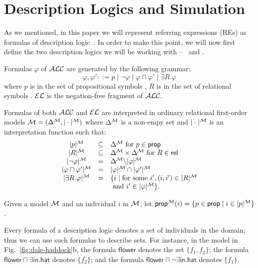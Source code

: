\section{Description Logics and Simulation} \label{sec:bisim}

As we mentioned, in this paper we will represent referring expressions
(REs) as formulas of description logic~\cite{baad:desc03}.  In order
to make this point, we will now first define the two description
logics we will be working with -- \alc\ and \el.


\begin{definition}
Formulas $\varphi$ of $\mathcal{ALC}$ are generated by the following grammar:
$$
\varphi,\varphi' ::= p \mid \neg \varphi \mid \varphi \sqcap \varphi'
\mid \exists R. \varphi
$$
where $p$ is in the set of propositional symbols \prop, $R$ is in the
set of relational symbols \rel. $\mathcal{EL}$ is the negation-free fragment of $\mathcal{ALC}$.

Formulas of both $\mathcal{ALC}$ and $\mathcal{EL}$ are interpreted in ordinary
relational first-order models $\mathcal{M} = (\Delta^{\mathcal{M}},|\cdot|^{\mathcal{M}})$ where
$\Delta^{\mathcal{M}}$ is a non-empy set and $|\cdot|^{\mathcal{M}}$ is an
interpretation function such that:
$$
\begin{array}{ccl}
|p|^{\mathcal{M}} & \subseteq & \Delta^{\mathcal{M}}  \mbox{ for $p \in \textsf{prop}$}\\
|R|^{\mathcal{M}} & \subseteq & \Delta^{\mathcal{M}} \times \Delta^{\mathcal{M}}  \mbox{ for $R \in \textsf{rel}$}\\
|\neg \varphi|^{\mathcal{M}} & = & \Delta^{\mathcal{M}} \backslash |\varphi|^{\mathcal{M}}\\
|\varphi \sqcap \varphi'|^{\mathcal{M}} & = & |\varphi|^{\mathcal{M}} \cap |\varphi'|^{\mathcal{M}}\\
|\exists R.\varphi|^{\mathcal{M}} & = & \{i \mid \mbox{for some } i', (i,i') \in |R|^{\mathcal{M}}\\
& & \mbox{ and } i' \in |\varphi|^{\mathcal{M}} \}.\\
\end{array}
$$

Given a model $\mathcal{M}$ and an individual $i$ in $\mathcal{M}$, let
$\textsf{prop}^{\mathcal{M}}(i) = \{p \in \textsf{prop} \mid i \in |p|^{\mathcal{M}}\}$.
\end{definition}

Every formula of a description logic denotes a set of individuals in
the domain; thus we can use such formulas to describe sets.  For
instance, in the model in Fig.~\ref{fig:dale-haddock}b, the formula
$\mathsf{flower}$ denotes the set $\{f_1,f_2\}$; the formula
$\mathsf{flower} \sqcap \exists \mathsf{in}.\mathsf{hat}$ denotes
$\{f_2\}$; and the formula $\mathsf{flower} \sqcap \neg
\exists \mathsf{in}.\mathsf{hat}$ denotes $\{f_1\}$.

